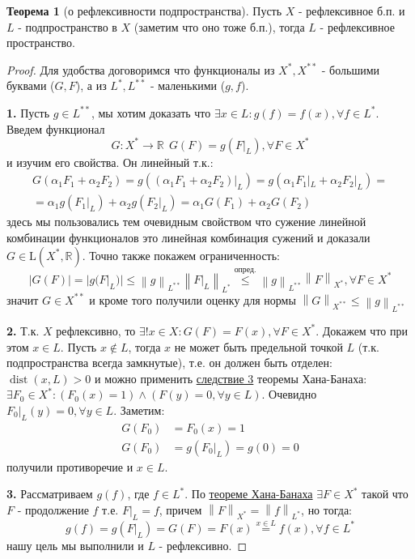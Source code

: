 \documentclass[12pt,a4paper]{article}
\theoremstyle{definition}
\newtheorem{theorem}{Теорема}
\newcommand{\Real}{\mathbb{R}}
\newcommand{\norm}[1]{\left\lVert#1\right\rVert}
\DeclareMathOperator{\dist}{dist}
\newcommand{\linear}[2]{\textrm{L}(#1, #2)}
\begin{document}
\begin{theorem}[о рефлексивности подпространства]
	Пусть $X$ - рефлексивное б.п. и $L$ - подпространство в $X$ (заметим что оно тоже б.п.), тогда $L$ - рефлексивное пространство.
\end{theorem}
\begin{proof}
	Для удобства договоримся что функционалы из $X^*, X^{**}$ - большими буквами ($G, F$), а из $L^*, L^{**}$ - маленькими ($g, f$).
	
	\textbf{1.} Пусть $g \in L^{**}$, мы хотим доказать что $\exists x \in L: g(f) = f(x), \forall f \in L^*$. Введем функционал 
	$$G: X^* \to \Real \ \ G(F) = g(F|_L), \forall F \in X^*$$
	и изучим его свойства. Он линейный т.к.:
	\begin{multline*}
		G(\alpha_1 F_1 +\alpha_2 F_2) = g((\alpha_1 F_1 + \alpha_2 F_2)|_L) = g(\alpha_1 F_1|_L + \alpha_2 F_2 |_L) = \\ = \alpha_1 g(F_1|_L) + \alpha_2 g(F_2|_L) = \alpha_1 G(F_1) + \alpha_2 G(F_2)
	\end{multline*}
	здесь мы пользовались тем очевидным свойством что сужение линейной комбинации функционалов это линейная комбинация сужений и доказали $G \in \linear{X^*}{\Real}$. Точно также покажем ограниченность:
	$$|G(F)| = |g(F|_L)| \leq \norm{g}_{L^{**}} \norm{F|_L}_{L^*} \overset{\hyperref[corll:3]{\text{опред.}}}{\leq} \norm{g}_{L^{**}} \norm{F}_{X^*}, \forall F \in X^*$$
	значит $G \in X^{**}$ и кроме того получили оценку для нормы $\norm{G}_{X^{**}} \leq \norm{g}_{L^{**}}$
	
	\textbf{2.} Т.к. $X$ рефлексивно, то $\exists! x \in X: G(F) = F(x), \forall F \in X^*$. Докажем что при этом $x \in L$. Пусть $x \notin L$, тогда $x$ не может быть предельной точкой $L$ (т.к. подпространства всегда замкнутые), т.е. он должен быть отделен: $\dist(x, L) > 0$ и можно применить \hyperref[corll:4]{следствие 3} теоремы Хана-Банаха: $\exists F_0 \in X^*: (F_0 (x) = 1) \wedge (F(y) = 0, \forall y \in L)$. Очевидно $F_0 |_L (y) = 0, \forall y \in L$. Заметим:
	\begin{align*}
		G(F_0) &= F_0 (x) = 1 \\
		G(F_0) &= g(F_0 |_L) = g(0) = 0
	\end{align*}
	получили противоречие и $x \in L$.
	
	\textbf{3.} Рассматриваем $g(f)$, где $f \in L^*$. По \hyperref[th:1]{теореме Хана-Банаха} $\exists F \in X^*$ такой что $F$ - продолжение $f$ т.е. $F|_L = f$, причем $\norm{F}_{X^*} = \norm{f}_{L^*}$, но тогда:
	$$g(f) = g(F|_L) = G(F) = F(x) \overset{x \in L}{=} f(x), \forall f \in L^*$$
	нашу цель мы выполнили и $L$ - рефлексивно.
\end{proof}


\newpage
\renewcommand{\listtheoremname}{Список теорем и утверждений}
\listoftheorems[ignoreall, show={theorem,corollary}]
\end{document}
